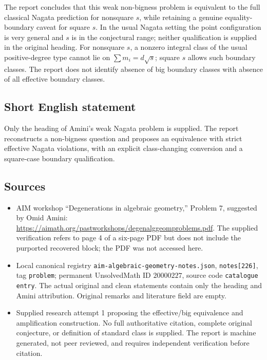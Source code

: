 \documentclass[11pt]{article}
\begin{document}
The report concludes that this weak non-bigness problem is equivalent to the full classical Nagata prediction for nonsquare \(s\), while retaining a genuine equality-boundary caveat for square \(s\). In the usual Nagata setting the point configuration is very general and \(s\) is in the conjectural range; neither qualification is supplied in the original heading. For nonsquare \(s\), a nonzero integral class of the usual positive-degree type cannot lie on \(\sum m_i=d\sqrt{s}\); square \(s\) allows such boundary classes. The report does not identify absence of big boundary classes with absence of all effective boundary classes.
\subsection{Short English statement}
Only the heading of Amini's weak Nagata problem is supplied. The report reconstructs a non-bigness question and proposes an equivalence with strict effective Nagata violations, with an explicit class-changing conversion and a square-case boundary qualification.
\subsection{Sources}
\begin{itemize}
\item AIM workshop ``Degenerations in algebraic geometry,'' Problem 7, suggested by Omid Amini: \url{https://aimath.org/pastworkshops/degenalggeomproblems.pdf}. The supplied verification refers to page 4 of a six-page PDF but does not include the purported recovered block; the PDF was not accessed here.
\item Local canonical registry \texttt{aim-algebraic-geometry-notes.json}, \texttt{notes[226]}, tag \texttt{problem}; permanent UnsolvedMath ID \(20000227\), source code \texttt{catalogue entry}. The actual original and clean statements contain only the heading and Amini attribution. Original remarks and literature field are empty.
\item Supplied research attempt 1 proposing the effective/big equivalence and amplification construction. No full authoritative citation, complete original conjecture, or definition of standard class is supplied. The report is machine generated, not peer reviewed, and requires independent verification before citation.
\end{itemize}
\end{document}
